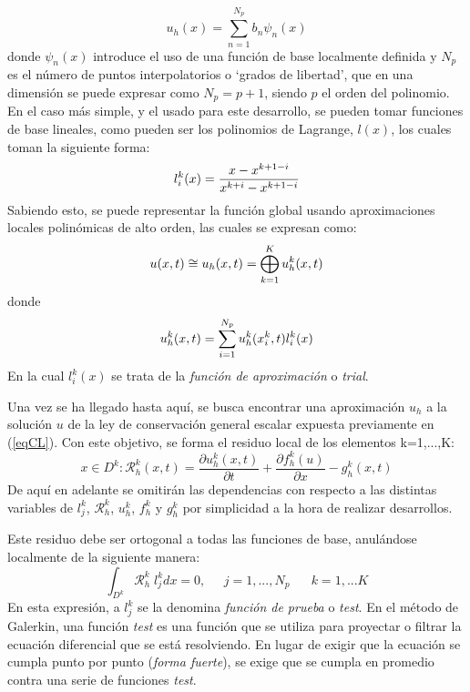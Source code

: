 \documentclass[11pt,a4paper,twoside,pdf]{article}
\numberwithin{equation}{section}
\begin{document}
\begin{equation}
    u_h(x)=\sum^{N_p}_{n=1}b_n\psi_n(x)
\end{equation}
donde $\psi_n(x)$ introduce el uso de una función de base localmente definida y $N_p$ es el número de puntos interpolatorios o `grados de libertad', que en una dimensión se puede expresar como $N_p=p+1$, siendo $p$ el orden del polinomio.  En el caso más simple, y el usado para este desarrollo, se pueden tomar funciones de base lineales, como pueden ser los polinomios de Lagrange, $l(x)$, los cuales toman la siguiente forma:
\begin{equation}
    l_i^k(x)=\frac{x-x^{k+1-i}}{x^{k+i}-x^{k+1-i}} \notag
\end{equation}
 Sabiendo esto, se puede representar la función global usando aproximaciones locales polinómicas de alto orden, las cuales se expresan como:
\begin{equation}
    u(x,t)\cong u_h(x,t)=\bigoplus^K_{k=1}u^k_h(x,t)\notag
\end{equation}
donde
\begin{equation}
    u^k_h(x,t)=\sum^{N_p}_{i=1}u^k_h(x^k_i,t)l^k_i(x)\notag
\end{equation}
En la cual $l^k_i(x)$ se trata de la \textit{función de aproximación} o \textit{trial}.

Una vez se ha llegado hasta aquí, se busca encontrar una aproximación $u_h$ a la solución $u$ de la ley de conservación general escalar expuesta previamente en (\ref{eqCL}). Con este objetivo, se forma el residuo local de los elementos k=1,...,K:
\begin{equation}
    x\in D^k: \mathcal{R}_h^k(x,t)=\frac{\partial u^k_h(x,t)}{\partial t} + \frac{\partial f^k_h(u)}{\partial x} - g^k_h(x,t) \label{residuo}
\end{equation}
De aquí en adelante se omitirán las dependencias con respecto a las distintas variables de $l_j^k$, $\mathcal{R}_h^k$, $u^k_h$, $f^k_h$ y $g^k_h$ por simplicidad a la hora de realizar desarrollos.

Este residuo debe ser ortogonal a todas las funciones de base, anulándose localmente de la siguiente manera:
\begin{equation}
    \int_{D^k} \mathcal{R}_h^k\;l_j^kdx=0, \;\;\;\;\; j=1,...,N_p \;\;\;\;\;\; k=1,...K \label{residuo2}
\end{equation}
En esta expresión, a $l_j^k$ se la denomina \textit{función de prueba} o \textit{test}. En el método de Galerkin, una función \textit{test} es una función que se utiliza para proyectar o filtrar la ecuación diferencial que se está resolviendo. En lugar de exigir que la ecuación se cumpla punto por punto (\textit{forma fuerte}), se exige que se cumpla en promedio contra una serie de funciones \textit{test}.
\end{document}
